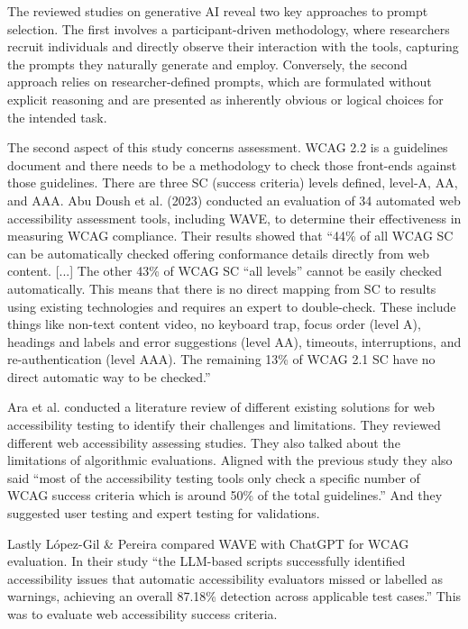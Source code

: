 \documentclass{article}
\begin{document}
The reviewed studies on generative AI reveal two key approaches to prompt selection. The first involves a participant-driven methodology, where researchers recruit individuals and directly observe their interaction with the tools, capturing the prompts they naturally generate and employ. Conversely, the second approach relies on researcher-defined prompts, which are formulated without explicit reasoning and are presented as inherently obvious or logical choices for the intended task.

The second aspect of this study concerns assessment. WCAG 2.2 is a guidelines document and there needs to be a methodology to check those front-ends against those guidelines. There are three SC (success criteria) levels defined, level-A, AA, and AAA. Abu Doush et al. (2023)\cite{abu_doush_web_2023} conducted an evaluation of 34 automated web accessibility assessment tools, including WAVE, to determine their effectiveness in measuring WCAG compliance. Their results showed that “44\% of all WCAG SC can be automatically checked offering conformance details directly from web content. [...] The other 43\% of WCAG SC “all levels” cannot be easily checked automatically. This means that there is no direct mapping from SC to results using existing technologies and requires an expert to double-check. These include things like non-text content video, no keyboard trap, focus order (level A), headings and labels and error suggestions (level AA), timeouts, interruptions, and re-authentication (level AAA). The remaining 13\% of WCAG 2.1 SC have no direct automatic way to be checked.” \cite{abu_doush_web_2023}

Ara et al. \cite{ara_inclusive_2024} conducted a literature review of different existing solutions for web accessibility testing to identify their challenges and limitations. They reviewed different web accessibility assessing studies. They also talked about the limitations of algorithmic evaluations. Aligned with the previous study they also said “most of the accessibility testing tools only check a specific number of WCAG success criteria which is around 50\% of the total guidelines.” And they suggested user testing and expert testing for validations. \cite{ara_inclusive_2024}

Lastly López-Gil \& Pereira \cite{lopez-gil_turning_2025} compared WAVE with ChatGPT for WCAG evaluation. In their study “the LLM-based scripts successfully identified accessibility issues that automatic accessibility evaluators missed or labelled as warnings, achieving an overall 87.18\% detection across applicable test cases.” This was to evaluate web accessibility success criteria. \cite{lopez-gil_turning_2025}
\end{document}
